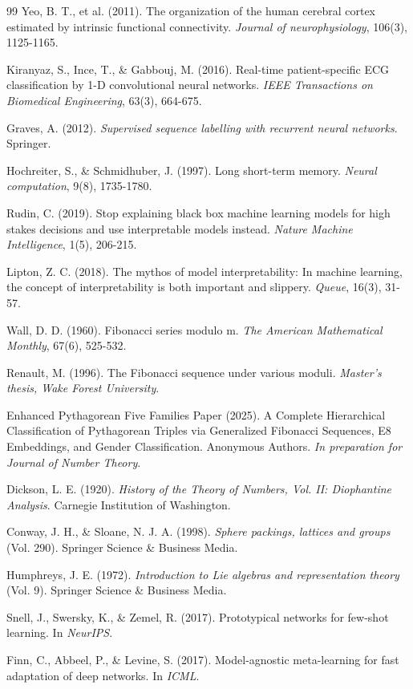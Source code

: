 \documentclass[11pt]{article}
\theoremstyle{remark}
\begin{document}
\begin{thebibliography}{99}
Yeo, B. T., et al. (2011). The organization of the human cerebral cortex estimated by intrinsic functional connectivity. \emph{Journal of neurophysiology}, 106(3), 1125-1165.

Kiranyaz, S., Ince, T., \& Gabbouj, M. (2016). Real-time patient-specific ECG classification by 1-D convolutional neural networks. \emph{IEEE Transactions on Biomedical Engineering}, 63(3), 664-675.

Graves, A. (2012). \emph{Supervised sequence labelling with recurrent neural networks}. Springer.

Hochreiter, S., \& Schmidhuber, J. (1997). Long short-term memory. \emph{Neural computation}, 9(8), 1735-1780.

Rudin, C. (2019). Stop explaining black box machine learning models for high stakes decisions and use interpretable models instead. \emph{Nature Machine Intelligence}, 1(5), 206-215.

Lipton, Z. C. (2018). The mythos of model interpretability: In machine learning, the concept of interpretability is both important and slippery. \emph{Queue}, 16(3), 31-57.

Wall, D. D. (1960). Fibonacci series modulo m. \emph{The American Mathematical Monthly}, 67(6), 525-532.

Renault, M. (1996). The Fibonacci sequence under various moduli. \emph{Master's thesis, Wake Forest University}.

Enhanced Pythagorean Five Families Paper (2025). A Complete Hierarchical Classification of Pythagorean Triples via Generalized Fibonacci Sequences, E8 Embeddings, and Gender Classification. Anonymous Authors. \emph{In preparation for Journal of Number Theory}.

Dickson, L. E. (1920). \emph{History of the Theory of Numbers, Vol. II: Diophantine Analysis}. Carnegie Institution of Washington.

Conway, J. H., \& Sloane, N. J. A. (1998). \emph{Sphere packings, lattices and groups} (Vol. 290). Springer Science \& Business Media.

Humphreys, J. E. (1972). \emph{Introduction to Lie algebras and representation theory} (Vol. 9). Springer Science \& Business Media.

Snell, J., Swersky, K., \& Zemel, R. (2017). Prototypical networks for few-shot learning. In \emph{NeurIPS}.

Finn, C., Abbeel, P., \& Levine, S. (2017). Model-agnostic meta-learning for fast adaptation of deep networks. In \emph{ICML}.

\end{thebibliography}
\end{document}
